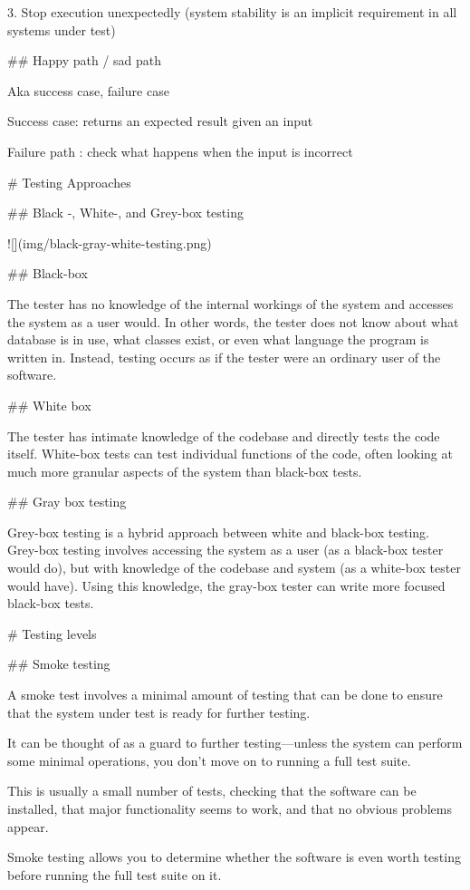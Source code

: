 3. Stop execution unexpectedly
(system stability is an implicit
requirement in all systems
under test)

## Happy path / sad path

Aka success case, failure case

Success case:  returns an expected result given an input

Failure path : check what happens when the input is incorrect


# Testing Approaches


## Black -, White-, and Grey-box testing

![](img/black-gray-white-testing.png)

## Black-box

The tester has no knowledge of the internal workings of the system and
accesses the system as a user would. In other words, the tester does not
know about what database is in use, what classes exist, or even what
language the program is written in. Instead, testing occurs as if the
tester were an ordinary user of the software.

## White box

The tester has
intimate knowledge of the codebase and directly tests
the code itself. White-box tests can test individual
functions of the code, often looking at much more
granular aspects of the system than black-box tests.

## Gray box testing

Grey-box testing is a hybrid approach between white
and black-box testing. Grey-box testing involves
accessing the system as a user (as a black-box tester
would do), but with knowledge of the codebase and
system (as a white-box tester would have). Using this
knowledge, the gray-box tester can write more focused
black-box tests.

# Testing levels

## Smoke testing

A smoke test involves a minimal amount of testing that
can be done to ensure that the system under test is ready
for further testing.

It can be thought of as a guard to further testing—unless
the system can perform some minimal operations, you
don’t move on to running a full test suite.

This is usually a small number of tests, checking that the
software can be installed, that major functionality seems
to work, and that no obvious problems appear.

Smoke testing allows you to determine whether the
software is even worth testing before running the full
test suite on it.

